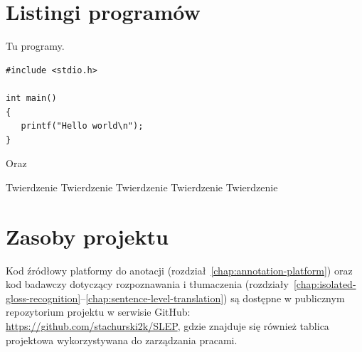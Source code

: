 
\section{Listingi programów}
\label{app:programs}

Tu programy.

\begin{verbatim}
#include <stdio.h>

int main()
{
   printf("Hello world\n");
}
\end{verbatim}

\noindent
Oraz

\bigskip

\vrule\hspace{10pt}\begin{minipage}{10cm}
\end{minipage}

\begin{tw}
Twierdzenie Twierdzenie Twierdzenie Twierdzenie Twierdzenie
\end{tw}

\section{Zasoby projektu}
\label{app:project-resources}

Kod źródłowy platformy do anotacji
(rozdział~\ref{chap:annotation-platform}) oraz kod badawczy dotyczący rozpoznawania
i tłumaczenia (rozdziały~\ref{chap:isolated-gloss-recognition}--\ref{chap:sentence-level-translation})
są dostępne w publicznym repozytorium projektu w serwisie GitHub:
\url{https://github.com/stachurski2k/SLEP}, gdzie znajduje się również tablica
projektowa wykorzystywana do zarządzania pracami.